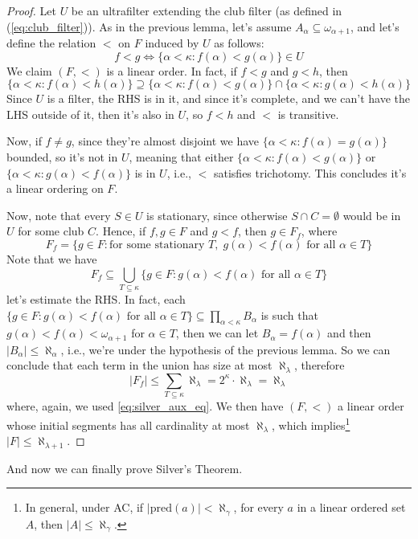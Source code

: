 \begin{proof}
    Let $U$ be an ultrafilter extending the club filter (as defined in (\ref{eq:club_filter})). As in the previous lemma, let's assume $A_\alpha\subseteq\omega_{\alpha+1}$, and let's define the relation $<$ on $F$ induced by $U$ as follows:
    $$f<g\iff \{\alpha<\kappa:f(\alpha)<g(\alpha)\}\in U$$
    We claim $(F,<)$ is a linear order. In fact, if $f<g$ and $g<h$, then
    $$\{\alpha<\kappa:f(\alpha)<h(\alpha)\}\supseteq\{\alpha<\kappa:f(\alpha)<g(\alpha)\}\cap\{\alpha<\kappa:g(\alpha)<h(\alpha)\}$$
    Since $U$ is a filter, the RHS is in it, and since it's complete, and we can't have the LHS outside of it, then it's also in $U$, so $f<h$ and $<$ is transitive.

    Now, if $f\neq g$, since they're almost disjoint we have $\{\alpha<\kappa:f(\alpha)=g(\alpha)\}$ bounded, so it's not in $U$, meaning that either $\{\alpha<\kappa:f(\alpha)<g(\alpha)\}$ or $\{\alpha<\kappa:g(\alpha)<f(\alpha)\}$ is in $U$, i.e., $<$ satisfies trichotomy. This concludes it's a linear ordering on $F$.

    Now, note that every $S\in U$ is stationary, since otherwise $S\cap C=\emptyset$ would be in $U$ for some club $C$. Hence, if $f,g\in F$ and $g<f$, then $g\in F_f$, where
    $$F_f=\{g\in F:\text{for some stationary }T,\; g(\alpha)<f(\alpha)\text{ for all }\alpha\in T\}$$
    Note that we have
    $$F_f\subseteq\bigcup_{T\subseteq\kappa}\{g\in F:g(\alpha)<f(\alpha)\text{ for all }\alpha\in T\}$$
    let's estimate the RHS. In fact, each $\{g\in F:g(\alpha)<f(\alpha)\text{ for all }\alpha\in T\}\subseteq\prod_{\alpha<\kappa}B_\alpha$ is such that $g(\alpha)<f(\alpha)<\omega_{\alpha+1}$ for $\alpha\in T$, then we can let $B_\alpha=f(\alpha)$ and then $\lvert B_\alpha\rvert\leq\aleph_\alpha$, i.e., we're under the hypothesis of the previous lemma. So we can conclude that each term in the union has size at most $\aleph_\lambda$, therefore
    $$\lvert F_f\rvert\leq\sum_{T\subseteq\kappa}\aleph_\lambda=2^\kappa\cdot \aleph_\lambda=\aleph_\lambda$$
    where, again, we used \cref{eq:silver_aux_eq}. We then have $(F,<)$ a linear order whose initial segments has all cardinality at most $\aleph_\lambda$, which implies\footnote{In general, under AC, if $\lvert\mathrm{pred}(a)\rvert<\aleph_\gamma$, for every $a$ in a linear ordered set $A$, then $\lvert A\rvert\leq\aleph_\gamma$.} $\lvert F\rvert\leq\aleph_{\lambda+1}$.
\end{proof}

And now we can finally prove Silver's Theorem.

